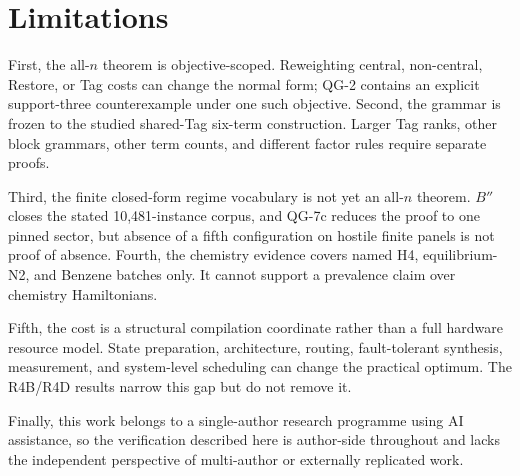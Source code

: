 \section{Limitations}

First, the all-$n$ theorem is objective-scoped. Reweighting central, non-central, Restore, or Tag costs can change the normal form; QG-2 contains an explicit support-three counterexample under one such objective. Second, the grammar is frozen to the studied shared-Tag six-term construction. Larger Tag ranks, other block grammars, other term counts, and different factor rules require separate proofs.

Third, the finite closed-form regime vocabulary is not yet an all-$n$ theorem. $B''$ closes the stated 10,481-instance corpus, and QG-7c reduces the proof to one pinned sector, but absence of a fifth configuration on hostile finite panels is not proof of absence. Fourth, the chemistry evidence covers named H4, equilibrium-N2, and Benzene batches only. It cannot support a prevalence claim over chemistry Hamiltonians.

Fifth, the cost is a structural compilation coordinate rather than a full hardware resource model. State preparation, architecture, routing, fault-tolerant synthesis, measurement, and system-level scheduling can change the practical optimum. The R4B/R4D results narrow this gap but do not remove it.

Finally, this work belongs to a single-author research programme using AI assistance, so the verification described here is author-side throughout and lacks the independent perspective of multi-author or externally replicated work.